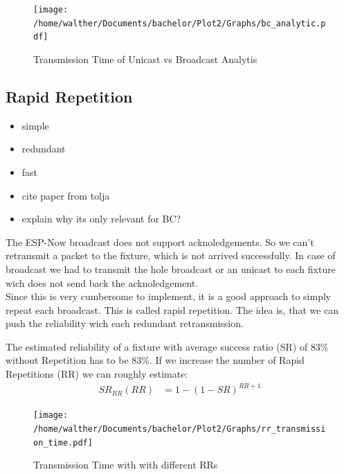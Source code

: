 \documentclass[]{ccs-thesis}
\begin{document}
\begin{figure}
	\centering
	\texttt{[image: /home/walther/Documents/bachelor/Plot2/Graphs/bc\_analytic.pdf]}
	\caption{Transmission Time of Unicast vs Broadcast Analytis}
	\label{fig:bc_analytic}
\end{figure}

\subsection{Rapid Repetition}
\begin{itemize}
\item simple
\item redundant
\item fast
\item cite paper from tolja
\item explain why its only relevant for BC?
\end{itemize}

The ESP-Now broadcast does not support acknoledgements.
So we can't retransmit a packet to the fixture, which is not arrived successfully.
In case of broadcast we had to transmit the hole broadcast or an unicast to each fixture wich does not send back the acknoledgement.\\

Since this is very cumbersome to implement, it is a good approach to simply repeat each broadcast. 
This is called rapid repetition. 
The idea is, that we can push the reliability wich each redundant retransmission.

The estimated reliability of a fixture with average success ratio (SR) of 83\% without Repetition has to be 83\%.
If we increase the number of Rapid Repetitions (RR) we can roughly estimate:
\begin{align}
	SR_{RR}(RR) &= 1-(1-SR)^{RR+1} 
\end{align}

\begin{figure}
	\centering
	\texttt{[image: /home/walther/Documents/bachelor/Plot2/Graphs/rr\_transmission\_time.pdf]}
	\caption{Transmission Time with with different \ac{RR}s}
	\label{fig:bc_analytic}
\end{figure}
\end{document}
